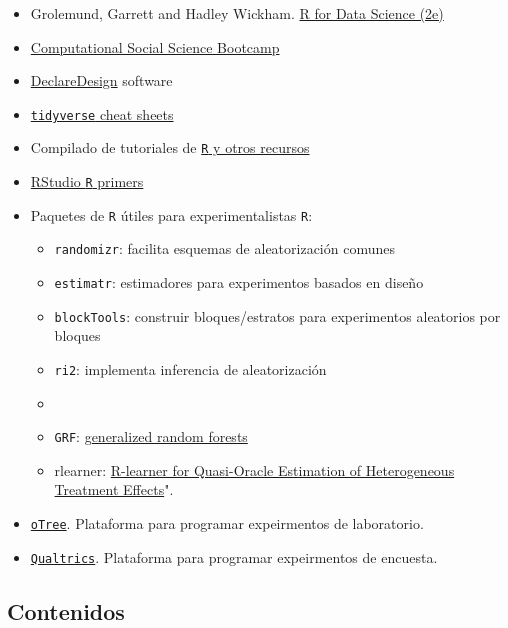 \documentclass[
  12pt,
]{article}
\providecommand{\tightlist}{%
  \setlength{\itemsep}{0pt}\setlength{\parskip}{0pt}}
\begin{document}
\begin{itemize}
\tightlist
\item
  Grolemund, Garrett and Hadley Wickham.
  \href{https://r4ds.hadley.nz/}{R for Data Science (2e)}
\item
  \href{https://sicss.io/boot_camp/}{Computational Social Science
  Bootcamp}
\item
  \href{https://declaredesign.org/getting-started/}{DeclareDesign}
  software
\item
  \href{https://posit.co/resources/cheatsheets/}{\texttt{tidyverse}
  cheat sheets}
\item
  Compilado de tutoriales de
  \href{https://github.com/Chris-Engelhardt/data_sci_guide/}{\texttt{R}
  y otros recursos}
\item
  \href{https://posit.cloud/learn/primers}{RStudio \texttt{R} primers}
\item
  Paquetes de \texttt{R} útiles para experimentalistas \texttt{R}:

  \begin{itemize}
  \tightlist
  \item
    \texttt{randomizr}: facilita esquemas de aleatorización comunes
  \item
    \texttt{estimatr}: estimadores para experimentos basados en diseño
  \item
    \texttt{blockTools}: construir bloques/estratos para experimentos
    aleatorios por bloques
  \item
    \texttt{ri2}: implementa inferencia de aleatorización
  \item
  \item
    \texttt{GRF}: \href{https://grf-labs.github.io/grf/}{generalized
    random forests}
  \item
    rlearner: \href{https://github.com/xnie/rlearner}{R-learner for
    Quasi-Oracle Estimation of Heterogeneous Treatment Effects}".
  \end{itemize}
\item
  \href{https://www.otree.org/}{\texttt{oTree}}. Plataforma para
  programar expeirmentos de laboratorio.
\item
  \href{https://www.qualtrics.com/}{\texttt{Qualtrics}}. Plataforma para
  programar expeirmentos de encuesta.
\end{itemize}

\hypertarget{contenidos-1}{%
\subsection{Contenidos}\label{contenidos-1}}
\end{document}
